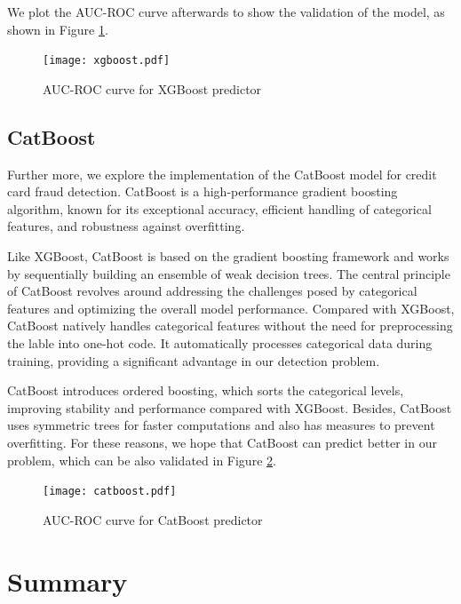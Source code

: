 We plot the AUC-ROC curve afterwards to show the validation of the model, as shown in Figure \ref{fig:XGBoost}.

\begin{figure}[h]
	\centering
	\texttt{[image: xgboost.pdf]}
	\caption{AUC-ROC curve for XGBoost predictor}
	\label{fig:XGBoost}
\end{figure}

\subsection{CatBoost}

Further more, we explore the implementation of the CatBoost model for credit card fraud detection. CatBoost is a high-performance gradient boosting algorithm, known for its exceptional accuracy, efficient handling of categorical features, and robustness against overfitting.

Like XGBoost, CatBoost is based on the gradient boosting framework and works by sequentially building an ensemble of weak decision trees. The central principle of CatBoost revolves around addressing the challenges posed by categorical features and optimizing the overall model performance. Compared with XGBoost, CatBoost natively handles categorical features without the need for preprocessing the lable into one-hot code. It automatically processes categorical data during training, providing a significant advantage in our detection problem. 

CatBoost introduces ordered boosting, which sorts the categorical levels, improving stability and performance compared with XGBoost. Besides, CatBoost uses symmetric trees for faster computations and also has measures to prevent overfitting. For these reasons, we hope that CatBoost can predict better in our problem, which can be also validated in Figure \ref{fig:catboost}.

\begin{figure}[h]
	\centering
	\texttt{[image: catboost.pdf]}
	\caption{AUC-ROC curve for CatBoost predictor}
	\label{fig:catboost}
\end{figure}



\section{Summary}







